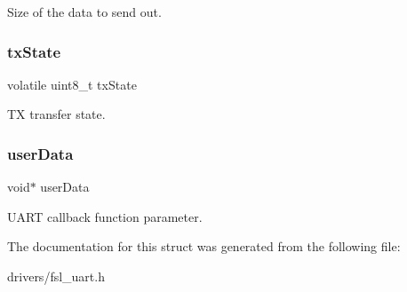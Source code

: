 Size of the data to send out. \mbox{\label{struct__uart__handle_a4e027f3342bad321ec60b56d164eb068}} 
\subsubsection{\texorpdfstring{txState}{txState}}
{\footnotesize\ttfamily volatile uint8\+\_\+t tx\+State}

TX transfer state. \mbox{\label{struct__uart__handle_a2e294dd14122c554baa0665072b4ca7a}} 
\subsubsection{\texorpdfstring{userData}{userData}}
{\footnotesize\ttfamily void$\ast$ user\+Data}

U\+A\+RT callback function parameter. 

The documentation for this struct was generated from the following file\+:\begin{DoxyCompactItemize}
\item 
drivers/fsl\+\_\+uart.\+h\end{DoxyCompactItemize}
